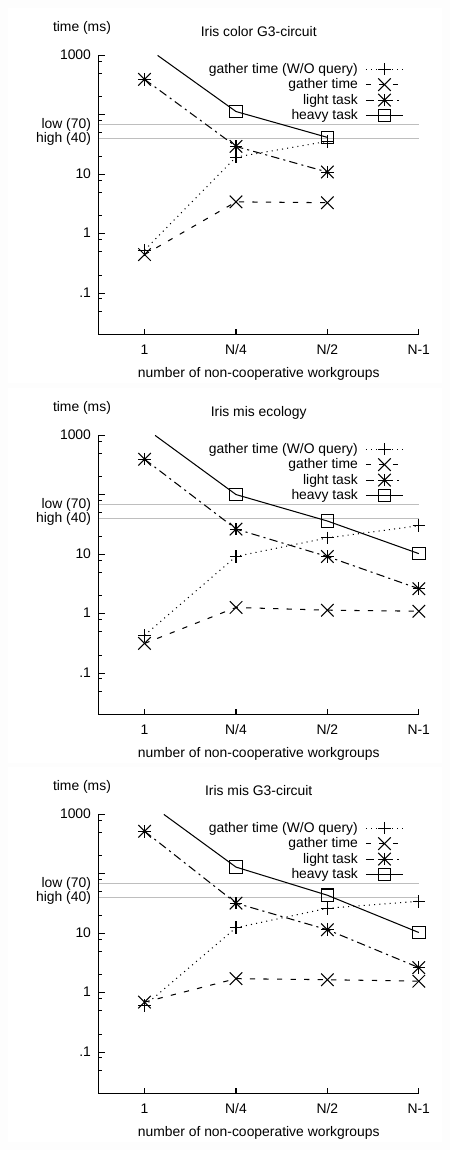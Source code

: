 \documentclass[parskip=half,sigconf,review, anonymous=true, acmcopyrightmode=none]{acmart}
\begin{document}
\includegraphics[width=.7\columnwidth]{images/barrier/iris_color_G3_circuit.pdf} \\
\includegraphics[width=.7\columnwidth]{images/barrier/iris_mis_ecology.pdf} \\
\includegraphics[width=.7\columnwidth]{images/barrier/iris_mis_G3_circuit.pdf} \\
\end{document}

